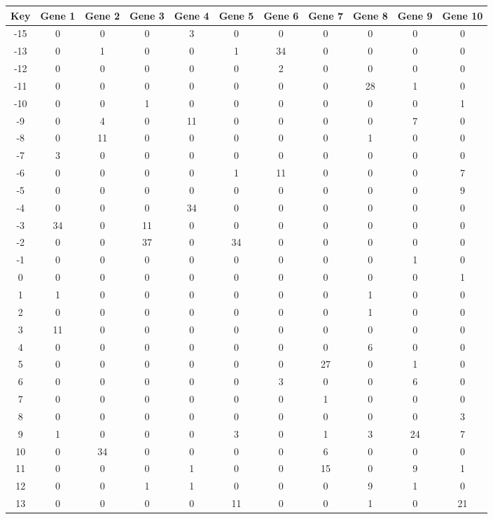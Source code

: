\begin{tabular}{|c|c|c|c|c|c|c|c|c|c|c|}
\hline
Key & Gene 1 & Gene 2 & Gene 3 & Gene 4 & Gene 5 & Gene 6 & Gene 7 & Gene 8 & Gene 9 & Gene 10 \\
\hline
-15 & 0 & 0 & 0 & 3 & 0 & 0 & 0 & 0 & 0 & 0 \\
-13 & 0 & 1 & 0 & 0 & 1 & 34 & 0 & 0 & 0 & 0 \\
-12 & 0 & 0 & 0 & 0 & 0 & 2 & 0 & 0 & 0 & 0 \\
-11 & 0 & 0 & 0 & 0 & 0 & 0 & 0 & 28 & 1 & 0 \\
-10 & 0 & 0 & 1 & 0 & 0 & 0 & 0 & 0 & 0 & 1 \\
-9 & 0 & 4 & 0 & 11 & 0 & 0 & 0 & 0 & 7 & 0 \\
-8 & 0 & 11 & 0 & 0 & 0 & 0 & 0 & 1 & 0 & 0 \\
-7 & 3 & 0 & 0 & 0 & 0 & 0 & 0 & 0 & 0 & 0 \\
-6 & 0 & 0 & 0 & 0 & 1 & 11 & 0 & 0 & 0 & 7 \\
-5 & 0 & 0 & 0 & 0 & 0 & 0 & 0 & 0 & 0 & 9 \\
-4 & 0 & 0 & 0 & 34 & 0 & 0 & 0 & 0 & 0 & 0 \\
-3 & 34 & 0 & 11 & 0 & 0 & 0 & 0 & 0 & 0 & 0 \\
-2 & 0 & 0 & 37 & 0 & 34 & 0 & 0 & 0 & 0 & 0 \\
-1 & 0 & 0 & 0 & 0 & 0 & 0 & 0 & 0 & 1 & 0 \\
0 & 0 & 0 & 0 & 0 & 0 & 0 & 0 & 0 & 0 & 1 \\
1 & 1 & 0 & 0 & 0 & 0 & 0 & 0 & 1 & 0 & 0 \\
2 & 0 & 0 & 0 & 0 & 0 & 0 & 0 & 1 & 0 & 0 \\
3 & 11 & 0 & 0 & 0 & 0 & 0 & 0 & 0 & 0 & 0 \\
4 & 0 & 0 & 0 & 0 & 0 & 0 & 0 & 6 & 0 & 0 \\
5 & 0 & 0 & 0 & 0 & 0 & 0 & 27 & 0 & 1 & 0 \\
6 & 0 & 0 & 0 & 0 & 0 & 3 & 0 & 0 & 6 & 0 \\
7 & 0 & 0 & 0 & 0 & 0 & 0 & 1 & 0 & 0 & 0 \\
8 & 0 & 0 & 0 & 0 & 0 & 0 & 0 & 0 & 0 & 3 \\
9 & 1 & 0 & 0 & 0 & 3 & 0 & 1 & 3 & 24 & 7 \\
10 & 0 & 34 & 0 & 0 & 0 & 0 & 6 & 0 & 0 & 0 \\
11 & 0 & 0 & 0 & 1 & 0 & 0 & 15 & 0 & 9 & 1 \\
12 & 0 & 0 & 1 & 1 & 0 & 0 & 0 & 9 & 1 & 0 \\
13 & 0 & 0 & 0 & 0 & 11 & 0 & 0 & 1 & 0 & 21 \\
\hline
\end{tabular}